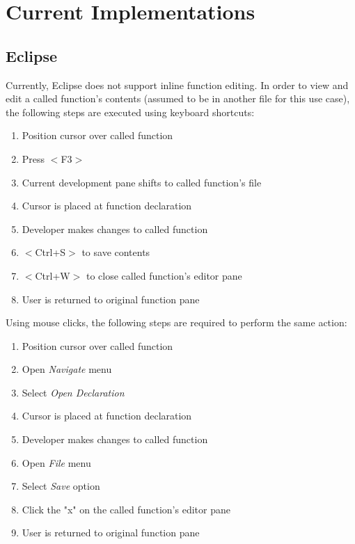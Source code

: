 \documentclass[]{report}
\begin{document}
\chapter{Current Implementations}

\section{Eclipse}

Currently, Eclipse does not support inline function editing.  In order to view and edit a called function's contents (assumed to be in another file for this use case), the following steps are executed using keyboard shortcuts:

	\begin{enumerate}
		\item 
		Position cursor over called function
		
		\item
		Press $<$F3$>$
		
		\item 
		Current development pane shifts to called function's file
		
		\item
		Cursor is placed at function declaration
		
		\item 
		Developer makes changes to called function
		
		\item 
		$<$Ctrl+S$>$ to save contents
		
		\item 
		$<$Ctrl+W$>$ to close called function's editor pane
		
		\item 
		User is returned to original function pane
	\end{enumerate}

Using mouse clicks, the following steps are required to perform the same action:

	\begin{enumerate}
		\item
		Position cursor over called function
		
		\item 
		Open \textit{Navigate} menu
		
		\item
		Select \textit{Open Declaration}
		
		\item
		Cursor is placed at function declaration
		
		\item 
		Developer makes changes to called function
		
		\item 
		Open \textit{File} menu
		
		\item
		Select \textit{Save} option
		
		\item 
		Click the "x" on the called function's editor pane
		
		\item 
		User is returned to original function pane
	\end{enumerate}
\end{document}
